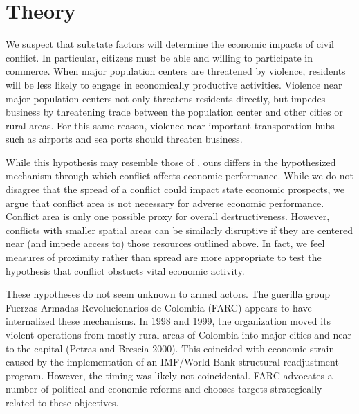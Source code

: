 \section{Theory}
\label{theory}


We suspect that substate factors will determine the economic impacts of civil conflict.  In particular, citizens must be able and willing to participate in commerce.  When major population centers are threatened by violence, residents will be less likely to engage in economically productive activities.  Violence near major population centers not only threatens residents directly, but impedes business by threatening trade between the population center and other cities or rural areas.  For this same reason, violence near important transporation hubs such as airports and sea ports should threaten business.

While this hypothesis may resemble those of \cite{imai:weinstein:2000}, ours differs in the hypothesized mechanism through which conflict affects economic performance.  While we do not disagree that the spread of a conflict could impact state economic prospects, we argue that conflict area is not necessary for adverse economic performance.  Conflict area is only one possible proxy for overall destructiveness.  However, conflicts with smaller spatial areas can be similarly disruptive if they are centered near (and impede access to) those resources outlined above.  In fact, we feel measures of proximity rather than spread are more appropriate to test the hypothesis that conflict obstucts vital economic activity.

These hypotheses do not seem unknown to armed actors.  The guerilla group Fuerzas Armadas Revolucionarios de Colombia (FARC) appears to have internalized these mechanisms.  In 1998 and 1999, the organization moved its violent operations from mostly rural areas of Colombia into major cities and near to the capital (Petras and Brescia 2000).  This coincided with economic strain caused by the implementation of an IMF/World Bank structural readjustment program.  However, the timing was likely not coincidental.  FARC advocates a number of political and economic reforms and chooses targets strategically related to these objectives.

